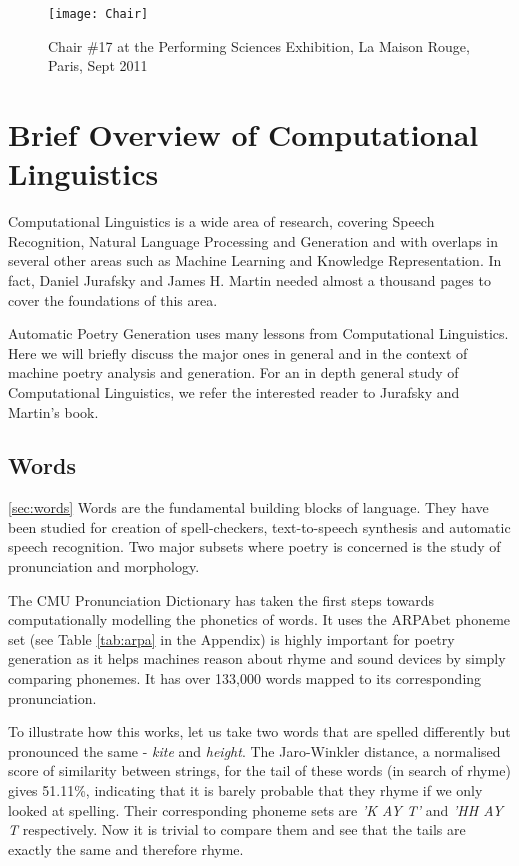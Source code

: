 \begin{figure}[h!]
\centering
\texttt{[image: Chair]}
\caption{Chair \#17 at the Performing Sciences Exhibition, La Maison Rouge, Paris, Sept 2011}
\label{fig:chair}
\end{figure}

\section{Brief Overview of Computational Linguistics}
Computational Linguistics is a wide area of research, covering Speech Recognition, Natural Language Processing and Generation and with overlaps in several other areas such as Machine Learning and Knowledge Representation. In fact, Daniel Jurafsky and James H. Martin needed almost a thousand pages to cover the foundations of this area\cite{jurafsky2000speech}.

Automatic Poetry Generation uses many lessons from Computational Linguistics. Here we will briefly discuss the major ones in general and in the context of machine poetry analysis and generation. For an in depth general study of Computational Linguistics, we refer the interested reader to Jurafsky and Martin's book.

\subsection{Words}
\ref{sec:words}
Words are the fundamental building blocks of language. They have been studied for creation of spell-checkers, text-to-speech synthesis and automatic speech recognition. Two major subsets where poetry is concerned is the study of pronunciation and morphology. 

The CMU Pronunciation Dictionary\cite{weide1998cmu} has taken the first steps towards computationally modelling the phonetics of words. It uses the ARPAbet phoneme set (see Table \ref{tab:arpa} in the Appendix) is highly important for poetry generation as it helps machines reason about rhyme and sound devices by simply comparing phonemes. It has over 133,000 words mapped to its corresponding pronunciation.

To illustrate how this works, let us take two words that are spelled differently but pronounced the same - \textit{kite} and \textit{height}. The Jaro-Winkler distance, a normalised score of similarity between strings, for the tail of these words (in search of rhyme) gives 51.11\%, indicating that it is barely probable that they rhyme if we only looked at spelling. Their corresponding phoneme sets are \textit{'K AY T'} and \textit{'HH AY T} respectively. Now it is trivial to compare them and see that the tails are exactly the same and therefore rhyme.


